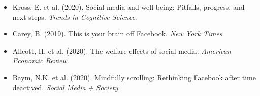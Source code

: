 \documentclass[aspectratio=169]{beamer}
\begin{document}
\begin{frame}

\begin{itemize}
\item Kross, E. et al. (2020). Social media and well-being: Pitfalls, progress, and next steps.  \textit{Trends in Cognitive Science}.
\item Carey, B. (2019). This is your brain off Facebook. \textit{New York Times}.
\item Allcott, H. et al. (2020). The welfare effects of social media. \textit{American Economic Review}.
\item Baym, N.K. et al. (2020). Mindfully scrolling: Rethinking Facebook after time deactived. \textit{Social Media + Society}.
\end{itemize}

\end{frame}
\end{document}

